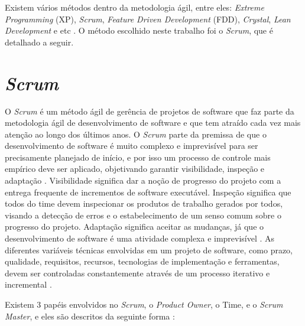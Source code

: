 Existem vários métodos dentro da metodologia ágil, entre eles: \textit{Extreme Programming} (XP), \textit{Scrum}, \textit{Feature Driven Development} (FDD), \textit{Crystal}, \textit{Lean Development} e etc \cite{agileMethods}. O método escolhido neste trabalho foi o \textit{Scrum}, que é detalhado a seguir.

\section{\textit{Scrum}}

O \textit{Scrum} é um método ágil de gerência de projetos de software que faz parte da metodologia ágil de desenvolvimento de software e que tem atraído cada vez mais atenção ao longo dos últimos anos. O \textit{Scrum} parte da premissa de que o desenvolvimento de software é muito complexo e imprevisível para ser precisamente planejado de início, e por isso um processo de controle mais empírico deve ser aplicado, objetivando garantir visibilidade, inspeção e adaptação \cite{scrum2005}. Visibilidade significa dar a noção de progresso do projeto com a entrega frequente de incrementos de software executável. Inspeção significa que todos do time devem inspecionar os produtos de trabalho gerados por todos, visando a detecção de erros e o estabelecimento de um senso comum sobre o progresso do projeto. Adaptação significa aceitar as mudanças, já que o desenvolvimento de software é uma atividade complexa e imprevisível \cite{agile2014}. As diferentes variáveis técnicas envolvidas em um projeto de software, como prazo, qualidade, requisitos, recursos, tecnologias de implementação e ferramentas,  devem ser controladas constantemente através de um processo iterativo e incremental \cite{scrum2005}.

Existem 3 papéis envolvidos no \textit{Scrum}, o \textit{Product Owner}, o Time, e o \textit{Scrum Master}, e eles são descritos da seguinte forma \cite{scrum2005}:

